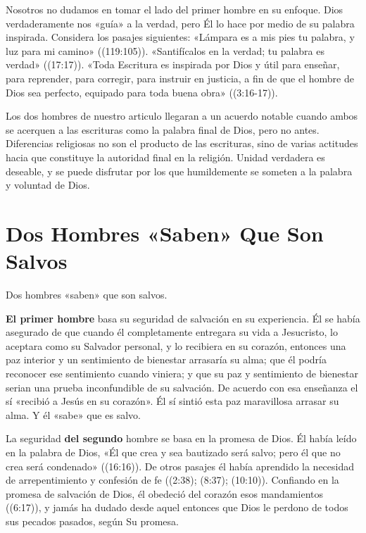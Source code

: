 \documentclass[12pt, twoside, openright]{book}
\begin{document}
Nosotros no dudamos en tomar el lado del primer hombre en su enfoque. Dios verdaderamente nos «guía» a la verdad, pero Él lo hace por medio de su palabra inspirada. Considera los pasajes siguientes: «Lámpara es a mis pies tu palabra, y luz para mi camino» ((119:105)). «Santifícalos en la verdad; tu palabra es verdad» ((17:17)). «Toda Escritura es inspirada por Dios y útil para enseñar, para reprender, para corregir, para instruir en justicia, a fin de que el hombre de Dios sea perfecto, equipado para toda buena obra» ((3:16-17)).

Los dos hombres de nuestro articulo llegaran a un acuerdo notable cuando ambos se acerquen a las escrituras como la palabra final de Dios, pero no antes. Diferencias religiosas no son el producto de las escrituras, sino de varias actitudes hacia que constituye la autoridad final en la religión. Unidad verdadera es deseable, y se puede disfrutar por los que humildemente se someten a la palabra y voluntad de Dios. 

\section{Dos Hombres «Saben» Que Son Salvos}
Dos hombres «saben» que son salvos. 

\textbf{El primer hombre} basa su seguridad de salvación en su experiencia. Él se había asegurado de que cuando él completamente entregara su vida a Jesucristo, lo aceptara como su Salvador personal, y lo recibiera en su corazón, entonces una paz interior y un sentimiento de bienestar arrasaría su alma; que él podría reconocer ese sentimiento cuando viniera; y que su paz y sentimiento de bienestar serian una prueba inconfundible de su salvación. De acuerdo con esa enseñanza el sí «recibió a Jesús en su corazón». Él sí sintió esta paz maravillosa arrasar su alma. Y él «sabe» que es salvo. 

La seguridad \textbf{del segundo} hombre se basa en la promesa de Dios. Él había leído en la palabra de Dios, «Él que crea y sea bautizado será salvo; pero él que no crea será condenado» ((16:16)). De otros pasajes él había aprendido la necesidad de arrepentimiento y confesión de fe ((2:38); (8:37); (10:10)). Confiando en la promesa de salvación de Dios, él obedeció del corazón esos mandamientos ((6:17)), y jamás ha dudado desde aquel entonces que Dios le perdono de todos sus pecados pasados, según Su promesa.
\end{document}
